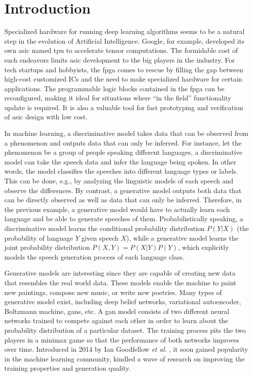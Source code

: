 
\chapter{Introduction}

Specialized hardware for running deep learning algorithms seems to be a natural step in the evolution of
Artificial Intelligence.  Google, for example, developed its own \gls{asic} named \gls{tpu}
to accelerate tensor computations. The formidable cost of such endeavors limits \gls{asic} development to
the big players in the industry. For tech startups and hobbyists, the \gls{fpga} comes to rescue by filling
the gap between high-cost customized ICs and the need to make specialized hardware for certain
applications. The programmable logic blocks contained in the \gls{fpga} can be reconfigured, making it
ideal for situations where ``in the field'' functionality update is required. It is also a valuable tool
for fast prototyping and verification of \gls{asic} design with low cost.

In machine learning, a discriminative model takes data that can be observed from a phenomenon and outputs
data that can only be inferred. For instance, let the phenomenon be a group of people speaking different
languages, a discriminative model can take the speech data and infer the language being spoken. In other
words, the model classifies the speeches into different language types or labels. This can be done, e.g.,
by analyzing the linguistic models of each speech and observe the differences. By contrast, a generative
model outputs both data that can be directly observed as well as data that can only be inferred. Therefore,
in the previous example, a generative model would have to actually learn each language and be able to generate
speeches of them. Probabilistically speaking, a discriminative model learns the conditional probability
distribution $P(Y \vert X)$ (the probability of language $Y$ given speech $X$), while a generative model
learns the joint probability distribution $P(X,Y) = P(X \vert Y)P(Y)$, which explicitly models the speech
generation process of each language class.

Generative models are interesting since they are capable of creating new data that resembles the real world
data. These models enable the machine to paint new paintings, compose new music, or write new poetries.
Many types of generative model exist, including deep belief networks, variational autoencoder,
Boltzmann machine, \glspl{gan}, etc. A \gls{gan} model consists of two different neural networks trained to
compete against each other in order to learn about the probability distribution of a particular dataset.
The training process pits the two players in a minimax game so that the performance of both networks improves
over time. Introduced in 2014 by Ian Goodfellow \textit{et al.} \cite{goodfellow:gan}, it soon gained
popularity in the machine learning community, kindled a wave of research on improving the training properties
and generation quality.

